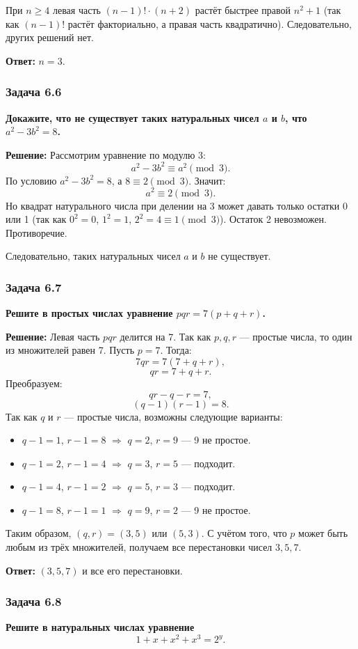 \documentclass[12pt, a4paper]{article}
\begin{document}
При $n \ge 4$ левая часть $(n-1)! \cdot (n+2)$ растёт быстрее правой $n^2 + 1$ (так как $(n-1)!$ растёт факториально, а правая часть квадратично). Следовательно, других решений нет.

\textbf{Ответ:} $n = 3$.

\subsubsection*{Задача 6.6}
\textbf{Докажите, что не существует таких натуральных чисел $a$ и $b$, что $a^2 - 3b^2 = 8$.}

\textbf{Решение:}
Рассмотрим уравнение по модулю 3:
\[
a^2 - 3b^2 \equiv a^2 \pmod{3}.
\]
По условию $a^2 - 3b^2 = 8$, а $8 \equiv 2 \pmod{3}$. Значит:
\[
a^2 \equiv 2 \pmod{3}.
\]
Но квадрат натурального числа при делении на 3 может давать только остатки 0 или 1 (так как $0^2 = 0$, $1^2 = 1$, $2^2 = 4 \equiv 1 \pmod{3}$). Остаток 2 невозможен. Противоречие.

Следовательно, таких натуральных чисел $a$ и $b$ не существует.

\subsubsection*{Задача 6.7}
\textbf{Решите в простых числах уравнение $pqr = 7(p+q+r)$.}

\textbf{Решение:}
Левая часть $pqr$ делится на 7. Так как $p, q, r$ — простые числа, то один из множителей равен 7. Пусть $p = 7$. Тогда:
\[
7qr = 7(7 + q + r),
\]
\[
qr = 7 + q + r.
\]
Преобразуем:
\[
qr - q - r = 7,
\]
\[
(q-1)(r-1) = 8.
\]
Так как $q$ и $r$ — простые числа, возможны следующие варианты:
\begin{itemize}
    \item $q-1 = 1$, $r-1 = 8$ $\Rightarrow$ $q = 2$, $r = 9$ — 9 не простое.
    \item $q-1 = 2$, $r-1 = 4$ $\Rightarrow$ $q = 3$, $r = 5$ — подходит.
    \item $q-1 = 4$, $r-1 = 2$ $\Rightarrow$ $q = 5$, $r = 3$ — подходит.
    \item $q-1 = 8$, $r-1 = 1$ $\Rightarrow$ $q = 9$, $r = 2$ — 9 не простое.
\end{itemize}
Таким образом, $(q, r) = (3, 5)$ или $(5, 3)$. С учётом того, что $p$ может быть любым из трёх множителей, получаем все перестановки чисел $3, 5, 7$.

\textbf{Ответ:} $(3, 5, 7)$ и все его перестановки.

\subsubsection*{Задача 6.8}
\textbf{Решите в натуральных числах уравнение}
\[
1 + x + x^2 + x^3 = 2^y.
\]
\end{document}
